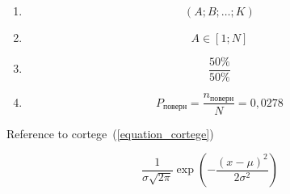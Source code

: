 \documentclass[11pt,twoside]{article}
\begin{document}
    \begin{enumerate}
        \item \begin{equation}
                  \label{equation_cortege}
                  (A;B;\dots;K)
        \end{equation}

        \item \begin{equation}
                  \label{equation_aRange}
                  A\in[1;N]
        \end{equation}

        \item \begin{equation}
                  \label{equation_halfOnHalf}
                  \frac{50\%}{50\%}
        \end{equation}

        \item \begin{equation}
                  \label{equation_twoWindowsCustomersDistribution}
                  P_\text{поверн}=\frac{n_\text{поверн}}{N}=0,0278
        \end{equation}

    \end{enumerate}

    \noindent\makebox[\linewidth]{\rule{\paperwidth}{0.4pt}}

    Reference to cortege~(\ref{equation_cortege})

    \noindent\makebox[\linewidth]{\rule{\paperwidth}{0.4pt}}

    \begin{equation}
        \label{eq:normal_dist}
        \frac{1}{\sigma\sqrt{2\pi}}
        \exp\left(-\frac{(x-\mu)^2}{2\sigma^2}\right)
    \end{equation}
\end{document}
